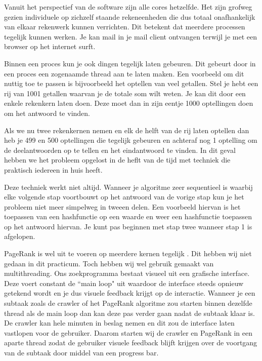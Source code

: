 \documentclass[12pt,a4paper]{article}
\begin{document}
Vanuit het perspectief van de software zijn alle cores hetzelfde. Het zijn grofweg gezien individuele op zichzelf staande rekeneenheden die dus totaal onafhankelijk van elkaar rekenwerk kunnen verrichten. Dit betekent dat meerdere processen tegelijk kunnen werken. Je kan mail in je mail client ontvangen terwijl je met een browser op het internet surft. 
\vspace{1pc}

Binnen een proces kun je ook dingen tegelijk laten gebeuren. Dit gebeurt door in een proces een zogenaamde thread aan te laten maken. Een voorbeeld om dit nuttig toe te passen is bijvoorbeeld het optellen van veel getallen. Stel je hebt een rij van 1001 getallen waarvan je de totale som wilt weten. Je kan dit door een enkele rekenkern laten doen. Deze moet dan in zijn eentje 1000 optellingen doen om het antwoord te vinden.

Als we nu twee rekenkernen nemen en elk de helft van de rij laten optellen dan heb je 499 en 500 optellingen die tegelijk gebeuren en achteraf nog 1 optelling om de deelantwoorden op te tellen en het eindantwoord te vinden. In dit geval hebben we het probleem opgelost in de heflt van de tijd met techniek die praktisch iedereen in huis heeft.
\vspace{1pc}

Deze techniek werkt niet altijd. Wanneer je algoritme zeer sequentieel is waarbij elke volgende stap voortbouwt op het antwoord van de vorige stap kun je het probleem niet meer simpelweg in tweeen delen. Een voorbeeld hiervan is het toepassen van een hashfunctie op een waarde en weer een hashfunctie toepassen op het antwoord hiervan. Je kunt pas beginnen met stap twee wanneer stap 1 is afgelopen.
\vspace{1pc}

PageRank is wel uit te voeren op meerdere kernen tegelijk \cite{4}. Dit hebben wij niet gedaan in dit practicum. Toch hebben wij wel gebruik gemaakt van multithreading.
Ons zoekprogramma bestaat visueel uit een grafische interface. Deze voert constant de ``main loop" uit waardoor de interface steeds opnieuw getekend wordt en je dus visuele feedback krijgt op de interactie. Wanneer je een subtaak zoals de crawler of het PageRank algoritme zou starten binnen dezelfde thread als de main loop dan kan deze pas verder gaan nadat de subtaak klaar is. De crawler kan hele minuten in beslag nemen en dit zou de interface laten vastlopen voor de gebruiker.
Daarom starten wij de crawler en PageRank in een aparte thread zodat de gebruiker visuele feedback blijft krijgen over de voortgang van de subtaak door middel van een progress bar.
\end{document}
